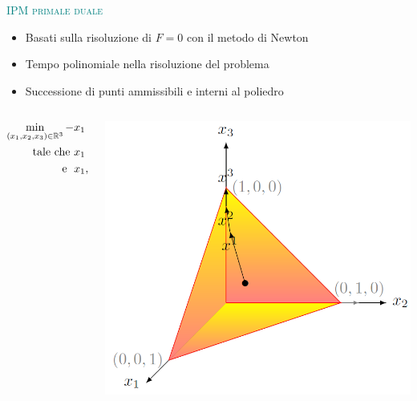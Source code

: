 
\begin{frame}{\textcolor{teal}{\textsc{\LARGE IPM primale duale}}}
	\begin{itemize}
		\pause
		\item Basati sulla risoluzione di $\mathit{F}= 0$ con il metodo di Newton
		\pause
		\item Tempo polinomiale nella risoluzione del problema
		\pause
		\item Successione di punti ammissibili e interni al poliedro
	\end{itemize}
\pause
\begin{columns}
	\begin{column}{0.4\textwidth}
		\begin{align*}
		\min\limits_{(x_{1},x_{2},x_{3})\in\mathbb{R}^{3}} -&x_{1}+ x_{2}-4x_{3}\\
		\text{tale che    }&x_{1}+x_{2}+x_{3}=1,\\
		\text{\; e   \;} &x_{1}, x_{2}, x_{3} \geq 0
		\end{align*}
	\end{column}
	\pause
	\begin{column}{0.4\textwidth}
		\includegraphics[width=\columnwidth]{Feas2.jpg}
	\end{column}
\end{columns}
\end{frame}



